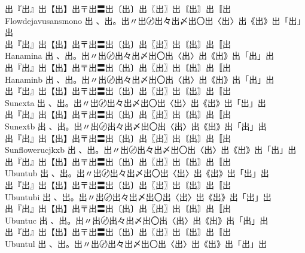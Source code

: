 \begin{tabbing}
\> {\mktsFontfileEbgaramondtwelvesc{}出『出』出【出】出〒出〓出〔出〕出〖出〗出〘出〙出〚出} \\
Flowdejavusansmono \> {\mktsFontfileFlowdejavusansmono{}出 、出。出〃出〄出々出〆出〇出〈出〉出《出》出「出」出}\\
\> {\mktsFontfileFlowdejavusansmono{}出『出』出【出】出〒出〓出〔出〕出〖出〗出〘出〙出〚出} \\
Hanamina \> {\mktsFontfileHanamina{}出 、出。出〃出〄出々出〆出〇出〈出〉出《出》出「出」出}\\
\> {\mktsFontfileHanamina{}出『出』出【出】出〒出〓出〔出〕出〖出〗出〘出〙出〚出} \\
Hanaminb \> {\mktsFontfileHanaminb{}出 、出。出〃出〄出々出〆出〇出〈出〉出《出》出「出」出}\\
\> {\mktsFontfileHanaminb{}出『出』出【出】出〒出〓出〔出〕出〖出〗出〘出〙出〚出} \\
Sunexta \> {\mktsFontfileSunexta{}出 、出。出〃出〄出々出〆出〇出〈出〉出《出》出「出」出}\\
\> {\mktsFontfileSunexta{}出『出』出【出】出〒出〓出〔出〕出〖出〗出〘出〙出〚出} \\
Sunextb \> {\mktsFontfileSunextb{}出 、出。出〃出〄出々出〆出〇出〈出〉出《出》出「出」出}\\
\> {\mktsFontfileSunextb{}出『出』出【出】出〒出〓出〔出〕出〖出〗出〘出〙出〚出} \\
Sunflowerucjkxb \> {\mktsFontfileSunflowerucjkxb{}出 、出。出〃出〄出々出〆出〇出〈出〉出《出》出「出」出}\\
\> {\mktsFontfileSunflowerucjkxb{}出『出』出【出】出〒出〓出〔出〕出〖出〗出〘出〙出〚出} \\
Ubuntub \> {\mktsFontfileUbuntub{}出 、出。出〃出〄出々出〆出〇出〈出〉出《出》出「出」出}\\
\> {\mktsFontfileUbuntub{}出『出』出【出】出〒出〓出〔出〕出〖出〗出〘出〙出〚出} \\
Ubuntubi \> {\mktsFontfileUbuntubi{}出 、出。出〃出〄出々出〆出〇出〈出〉出《出》出「出」出}\\
\> {\mktsFontfileUbuntubi{}出『出』出【出】出〒出〓出〔出〕出〖出〗出〘出〙出〚出} \\
Ubuntuc \> {\mktsFontfileUbuntuc{}出 、出。出〃出〄出々出〆出〇出〈出〉出《出》出「出」出}\\
\> {\mktsFontfileUbuntuc{}出『出』出【出】出〒出〓出〔出〕出〖出〗出〘出〙出〚出} \\
Ubuntul \> {\mktsFontfileUbuntul{}出 、出。出〃出〄出々出〆出〇出〈出〉出《出》出「出」出}\\

\end{tabbing}
